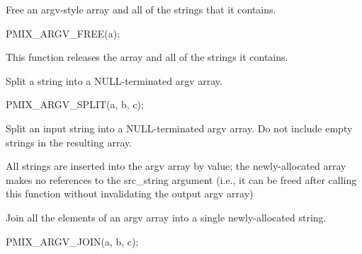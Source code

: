 
Free an argv-style array and all of the strings that it contains.

\cspecificstart
\begin{codepar}
PMIX_ARGV_FREE(a);
\end{codepar}
\cspecificend

\begin{arglist}
\end{arglist}

This function releases the array and all of the strings it contains.


Split a string into a NULL-terminated argv array.

\cspecificstart
\begin{codepar}
PMIX_ARGV_SPLIT(a, b, c);
\end{codepar}
\cspecificend

\begin{arglist}
\end{arglist}

Split an input string into a NULL-terminated argv array. Do not include empty strings in the resulting array.

\adviceuserstart
All strings are inserted into the argv array by value; the newly-allocated array makes no references to the src_string argument (i.e., it can be freed after calling this function without invalidating the output argv array)
\adviceuserend


Join all the elements of an argv array into a single newly-allocated string.

\cspecificstart
\begin{codepar}
PMIX_ARGV_JOIN(a, b, c);
\end{codepar}
\cspecificend

\begin{arglist}
\end{arglist}


